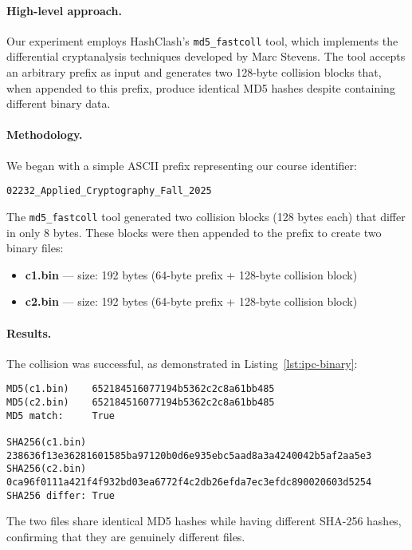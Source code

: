 \documentclass[runningheads]{llncs}
\begin{document}
    \paragraph{High-level approach.}
    Our experiment employs HashClash's \texttt{md5\_fastcoll} tool, which implements the differential cryptanalysis techniques developed by Marc Stevens. The tool accepts an arbitrary prefix as input and generates two 128-byte collision blocks that, when appended to this prefix, produce identical MD5 hashes despite containing different binary data.

    \paragraph{Methodology.}
    We began with a simple ASCII prefix representing our course identifier:
    \begin{lstlisting}[style=textblock]
02232_Applied_Cryptography_Fall_2025
    \end{lstlisting}

    The \texttt{md5\_fastcoll} tool generated two collision blocks (128 bytes each) that differ in only 8 bytes. These blocks were then appended to the prefix to create two binary files:
    \begin{itemize}
        \item \textbf{c1.bin} — size: 192 bytes (64-byte prefix + 128-byte collision block)
        \item \textbf{c2.bin} — size: 192 bytes (64-byte prefix + 128-byte collision block)
    \end{itemize}

    \paragraph{Results.}
    The collision was successful, as demonstrated in Listing~\ref{lst:ipc-binary}:

    \begin{lstlisting}[style=hashblock,caption={MD5/SHA-256 of the binary collision pair},label={lst:ipc-binary}]
MD5(c1.bin)    652184516077194b5362c2c8a61bb485
MD5(c2.bin)    652184516077194b5362c2c8a61bb485
MD5 match:     True

SHA256(c1.bin) 238636f13e36281601585ba97120b0d6e935ebc5aad8a3a4240042b5af2aa5e3
SHA256(c2.bin) 0ca96f0111a421f4f932bd03ea6772f4c2db26efda7ec3efdc890020603d5254
SHA256 differ: True
    \end{lstlisting}

    The two files share identical MD5 hashes while having different SHA-256 hashes, confirming that they are genuinely different files.
\end{document}
